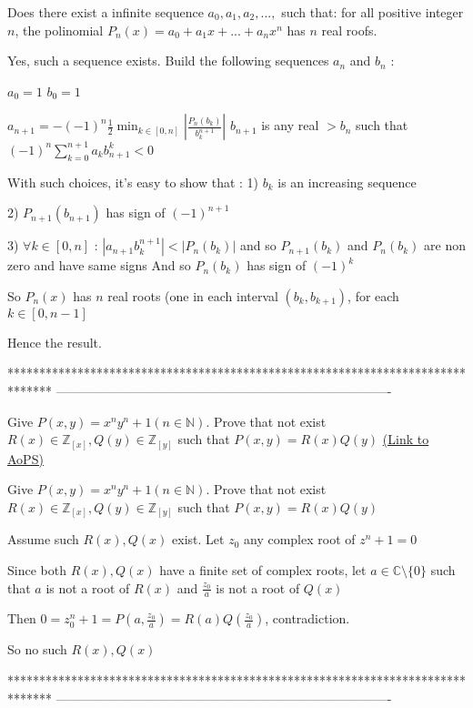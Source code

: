 \begin{solution}
	\begin{tcolorbox}Does there exist a infinite sequence $ a_0, a_1, a_2,...,$ such that: for all positive integer $n$, the polinomial $P_n(x)= a_0+a_1x+...+a_nx^{n} $ has $n$ real roofs.\end{tcolorbox}
Yes, such a sequence exists.
Build the following sequences $a_n$ and $b_n$ :

$a_0=1$
$b_0=1$

$a_{n+1}=-(-1)^n\frac 12\min_{k\in[0,n]}\left|\frac{P_n(b_k)}{b_k^{n+1}}\right|$
$b_{n+1}$ is any real $>b_n$ such that $(-1)^n\sum_{k=0}^{n+1}a_kb_{n+1}^k<0$

With such choices, it's easy to show that :
1) $b_k$ is an increasing sequence

2) $P_{n+1}(b_{n+1})$ has sign of $(-1)^{n+1}$

3) $\forall k\in[0,n]$ : $|a_{n+1}b_k^{n+1}|<|P_n(b_{k})|$ and so $P_{n+1}(b_k)$ and $P_{n}(b_{k})$ are non zero and have same signs
And so $P_n(b_k)$ has sign of $(-1)^k$ 

So $P_n(x)$ has $n$ real roots (one in each interval $(b_k,b_{k+1})$, for each $k\in[0,n-1]$

Hence the result.
\end{solution}
*******************************************************************************
-------------------------------------------------------------------------------

\begin{problem}
	Give $P(x,y)=x^ny^n+1 (n\in \mathbb N)$. Prove that not exist $R(x)\in \mathbb{Z}_{[x]}, Q(y)\in \mathbb{Z}_{[y]}$ such that $P(x,y)=R(x)Q(y)$
	\flushright \href{https://artofproblemsolving.com/community/c6h566409}{(Link to AoPS)}
\end{problem}



\begin{solution}
	\begin{tcolorbox}Give $P(x,y)=x^ny^n+1 (n\in \mathbb N)$. Prove that not exist $R(x)\in \mathbb{Z}_{[x]}, Q(y)\in \mathbb{Z}_{[y]}$ such that $P(x,y)=R(x)Q(y)$\end{tcolorbox}
Assume such $R(x),Q(x)$ exist.
Let $z_0$ any complex root of $z^n+1=0$

Since both $R(x),Q(x)$ have a finite set of complex roots, let $a\in\mathbb C\setminus\{0\}$ such that $a$ is not a root of $R(x)$ and $\frac{z_0}a$ is not a root of $Q(x)$

Then $0=z_0^n+1=P(a,\frac{z_0}a)=R(a)Q(\frac{z_0}a)$, contradiction.

So no such $R(x),Q(x)$
\end{solution}
*******************************************************************************
-------------------------------------------------------------------------------

